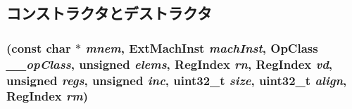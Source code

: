 \subsection{コンストラクタとデストラクタ}
\hypertarget{classArmISA_1_1VldMultOp_a754883decfb95a4817c7650fc301a435}{
\subsubsection[{VldMultOp}]{ (const char $\ast$ {\em mnem}, \/  {\bf ExtMachInst} {\em machInst}, \/  OpClass {\em \_\-\_\-opClass}, \/  unsigned {\em elems}, \/  {\bf RegIndex} {\em rn}, \/  {\bf RegIndex} {\em vd}, \/  unsigned {\em regs}, \/  unsigned {\em inc}, \/  {\bf uint32\_\-t} {\em size}, \/  {\bf uint32\_\-t} {\em align}, \/  {\bf RegIndex} {\em rm})}}
\label{classArmISA_1_1VldMultOp_a754883decfb95a4817c7650fc301a435}




